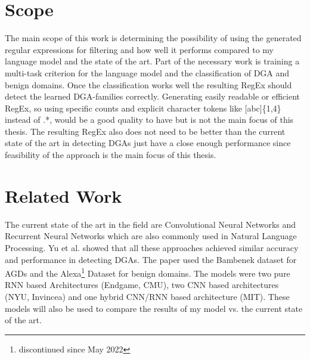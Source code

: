 \documentclass[a4paper, 12pt]{article}
\begin{document}
\section{Scope}
The main scope of this work is determining the possibility of using the generated regular
expressions for filtering and how well it performs compared to my language model and the state of the art.
Part of the necessary work is training a multi-task criterion for the language model and the
classification of DGA and benign domains. 
Once the classification works well the resulting RegEx should detect the learned DGA-families
correctly. Generating easily readable or efficient RegEx, so using specific counts and explicit
character tokens like [abc]\{1,4\} instead of .*, would be a good quality to have but is not
the main focus of this thesis. 
The resulting RegEx also does not need to be better than the current state of the art in detecting
DGAs just have a close enough performance since feasibility of the approach is the main focus of
this thesis.

\section{Related Work}
The current state of the art in the field are Convolutional Neural Networks and Recurrent Neural
Networks which are also commonly used in Natural Language Processing. Yu et al.
\cite{yu_character_2018} showed that all these approaches achieved similar accuracy and performance
in detecting DGAs.  The paper used the Bambenek dataset \cite{bambenek_feed_2024} for AGDs and the
Alexa\footnote{discontinued since May 2022} Dataset for benign
domains. The models were two pure RNN based Architectures (Endgame, CMU), two CNN based
architectures (NYU, Invincea) and one hybrid CNN/RNN based architecture (MIT). 
These models will also be used to compare the results of my model vs. the current state of the art.

\clearpage

\printbibliography
\end{document}
